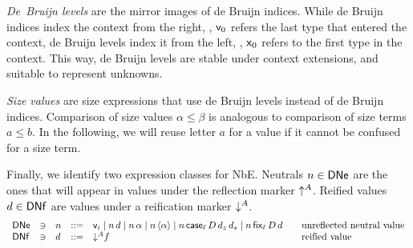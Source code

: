 \documentclass[acmsmall%
]{acmart}\settopmatter{printfolios=true}
\begin{document}
\emph{De~Bruijn levels} are the mirror images of de Bruijn indices.  While de Bruijn
indices index the context from the right, \ie, $\mathsf{v}_{0}$ refers the
last type that entered the context, de Bruijn levels index it from the
left, \ie, $\mathsf{x}_{0}$ refers to the first type in the context.  This
way, de Bruijn levels are stable under context extensions, and
suitable to represent unknowns.

\emph{Size values} \fbox{$\alpha, \beta \in \SIZE$} are size
expressions that use de Bruijn levels instead of de Bruijn
indices. Comparison of size values $\alpha \leq \beta$ is
analogous to comparison of size terms $a \leq b$.  In the following, we
will reuse letter $a$ for a value if it cannot be confused for a size
term.

Finally, we identify two expression classes for NbE. Neutrals
$n \in \mathsf{DNe}$ are the ones that will appear in values under the
reflection marker $\mathord{\uparrow^{A}}$.  Reified values $d \in \mathsf{DNf}$ are values
under a reification marker $\mathord{\downarrow^{A}}$.
\[
\begin{array}{lllll@{\qquad}l}
  \DNe & \ni &
  n & ::= & \ind i \mid n\,d \mid n\,\alpha \mid n\,\ann \alpha \mid
            n\,\case[\ell] D{d_z}{d_s} \mid n\,\fix[\ell] D d
    & \mbox{unreflected neutral value} \\
  \DNf & \ni &
  d & ::= & \down A f
    & \mbox{reified value} \\
\end{array}
\]
\end{document}
